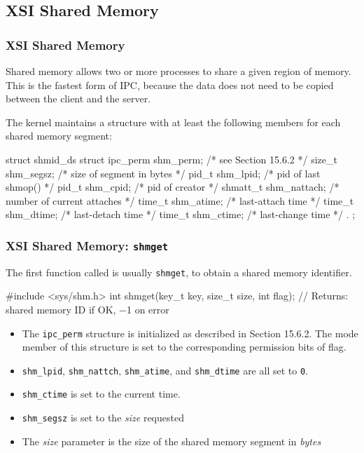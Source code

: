\documentclass[newPxFont,sthlmFooter,nooffset]{beamer}
\begin{document}
\subsection{XSI Shared Memory}

\begin{frame}[t, fragile]
  \frametitle{XSI Shared Memory}
Shared memory allows two or more processes to share a given region of memory. This is the fastest form of IPC, because the data does not need to be copied between the client and the server. 

The kernel maintains a structure with at least the following members for each shared memory segment:
\begin{codedefnb}
struct shmid_ds {
  struct ipc_perm  shm_perm;     /* see Section 15.6.2 */
  size_t           shm_segsz;    /* size of segment in bytes */
  pid_t            shm_lpid;     /* pid of last shmop() */
  pid_t            shm_cpid;     /* pid of creator */
  shmatt_t         shm_nattach;  /* number of current attaches */
  time_t           shm_atime;    /* last-attach time */
  time_t           shm_dtime;    /* last-detach time */
  time_t           shm_ctime;    /* last-change time */
  .
};
\end{codedefnb}
\end{frame}



\begin{frame}[t, fragile]
  \frametitle{XSI Shared Memory: \texttt{shmget}}
The first function called is usually \texttt{shmget}, to obtain a shared memory identifier.
\begin{codedef}
#include <sys/shm.h>
int shmget(key_t key, size_t size, int flag);
// Returns: shared memory ID if OK, −1 on error
\end{codedef}
\begin{itemize}
\item The \texttt{ipc\_perm} structure is initialized as described in Section 15.6.2. The mode member of this structure is set to the corresponding permission bits of flag. 
\item \texttt{shm\_lpid}, \texttt{shm\_nattch}, \texttt{shm\_atime}, and \texttt{shm\_dtime} are all set to \texttt{0}.
\item \texttt{shm\_ctime} is set to the current time.
\item \texttt{shm\_segsz} is set to the \textit{size} requested
\item The \textit{size} parameter is the size of the shared memory segment in \textit{bytes}
\end{itemize}
\end{frame}
\end{document}
